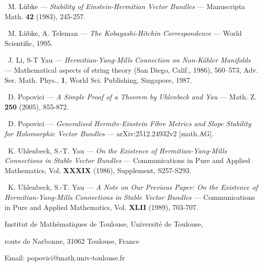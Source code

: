\documentclass[12pt]{article}
\begin{document}
\vspace{1ex}

\noindent [Lub83]\, M. L\"ubke --- {\it Stability of Einstein-Hermitian Vector Bundles} --- Manuscripta Math. {\bf 42} (1983), 245-257.

\vspace{1ex}

\noindent [LT95]\, M. L\"ubke, A. Teleman --- {\it The Kobayashi-Hitchin Correspondence} --- World Scientific, 1995.

\vspace{1ex}

\noindent [LY86]\, J. Li, S-T Yau --- {\it Hermitian-Yang-Mills Connection on Non-K\"ahler Manifolds} --- Mathematical aspects of string theory (San Diego, Calif., 1986), 560–573, Adv. Ser. Math. Phys., {\bf 1}, World Sci. Publishing, Singapore, 1987.

\vspace{1ex}


\noindent [Pop05]\, D. Popovici --- {\it A Simple Proof of a Theorem by Uhlenbeck and Yau} --- Math. Z. {\bf 250} (2005), 855-872.

\vspace{1ex}


\noindent [Pop25]\, D. Popovici --- {\it Generalised Hermite-Einstein Fibre Metrics and Slope Stability for Holomorphic Vector Bundles} --- arXiv:2512.24932v2 [math.AG].

\vspace{1ex}

\noindent [UY86]\, K. Uhlenbeck, S.-T. Yau --- {\it On the Existence of Hermitian-Yang-Mills Connections in Stable Vector Bundles} --- Communications in Pure and Applied Mathematics, Vol. {\bf XXXIX} (1986), Supplement, S257-S293. 

\vspace{1ex}

\noindent [UY89]\, K. Uhlenbeck, S.-T. Yau --- {\it A Note on Our Previous Paper: On the Existence of Hermitian-Yang-Mills Connections in Stable Vector Bundles} --- Communications in Pure and Applied Mathematics, Vol. {\bf XLII} (1989), 703-707.






\vspace{6ex}

\noindent Institut de Math\'ematiques de Toulouse, Universit\'e de Toulouse,

 route de Narbonne, 31062 Toulouse, France

\noindent Email: popovici@math.univ-toulouse.fr
\end{document}
